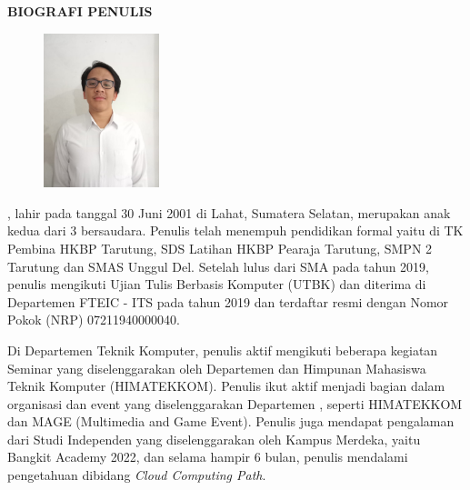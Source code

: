 \begin{center}
  \Large
  \textbf{BIOGRAFI PENULIS}
\end{center}


\vspace{2ex}

\begin{figure}
  \centering
  \vspace{-3ex}
  \includegraphics[width=0.3\textwidth]{gambar/John.jpeg}
  \vspace{-4ex}
\end{figure}

\name{}, lahir pada tanggal 30 Juni 2001 di Lahat, Sumatera Selatan, merupakan anak kedua dari 3 bersaudara. 
Penulis telah menempuh pendidikan formal yaitu di TK Pembina HKBP Tarutung, SDS Latihan HKBP Pearaja Tarutung, SMPN 2 Tarutung dan SMAS Unggul Del. 
Setelah lulus dari SMA pada tahun 2019, penulis mengikuti Ujian Tulis Berbasis Komputer (UTBK) dan diterima di Departemen \department{} FTEIC - ITS pada tahun 2019 dan terdaftar resmi dengan Nomor Pokok (NRP) 07211940000040.

Di Departemen Teknik Komputer, penulis aktif mengikuti beberapa kegiatan Seminar yang diselenggarakan oleh Departemen dan Himpunan Mahasiswa Teknik Komputer (HIMATEKKOM).
Penulis ikut aktif menjadi bagian dalam organisasi dan event yang diselenggarakan Departemen \department{}, seperti HIMATEKKOM dan MAGE (Multimedia and Game Event).
Penulis juga mendapat pengalaman dari Studi Independen yang diselenggarakan oleh Kampus Merdeka, yaitu Bangkit Academy 2022, dan selama hampir 6 bulan, penulis mendalami pengetahuan dibidang \emph{Cloud Computing Path}.
